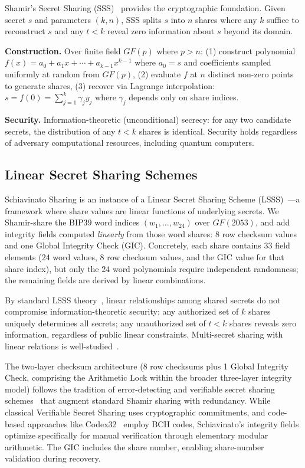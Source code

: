 \documentclass[11pt]{article}
\begin{document}
Shamir's Secret Sharing (SSS)~\cite{shamir1979} provides the cryptographic foundation. Given secret $s$ and parameters $(k, n)$, SSS splits $s$ into $n$ shares where any $k$ suffice to reconstruct $s$ and any $t < k$ reveal zero information about $s$ beyond its domain.

\textbf{Construction.} Over finite field $GF(p)$ where $p > n$: (1) construct polynomial $f(x) = a_0 + a_1 x + \cdots + a_{k-1} x^{k-1}$ where $a_0 = s$ and coefficients sampled uniformly at random from $GF(p)$, (2) evaluate $f$ at $n$ distinct non-zero points to generate shares, (3) recover via Lagrange interpolation: $s = f(0) = \sum_{j=1}^k \gamma_j y_j$ where $\gamma_j$ depends only on share indices.

\textbf{Security.} Information-theoretic (unconditional) secrecy: for any two candidate secrets, the distribution of any $t < k$ shares is identical. Security holds regardless of adversary computational resources, including quantum computers.

\subsection{Linear Secret Sharing Schemes}

Schiavinato Sharing is an instance of a Linear Secret Sharing Scheme (LSSS)~\cite{beimel2011}—a framework where share values are linear functions of underlying secrets. We Shamir-share the BIP39 word indices $(w_1,\ldots,w_{24})$ over $GF(2053)$, and add integrity fields computed \emph{linearly} from those word shares: 8 row checksum values and one Global Integrity Check (GIC). Concretely, each share contains 33 field elements (24 word values, 8 row checksum values, and the GIC value for that share index), but only the 24 word polynomials require independent randomness; the remaining fields are derived by linear combinations.

By standard LSSS theory~\cite{cramer2000}, linear relationships among shared secrets do not compromise information-theoretic security: any authorized set of $k$ shares uniquely determines all secrets; any unauthorized set of $t < k$ shares reveals zero information, regardless of public linear constraints. Multi-secret sharing with linear relations is well-studied~\cite{blundo1993}.

The two-layer checksum architecture (8 row checksums plus 1 Global Integrity Check, comprising the Arithmetic Lock within the broader three-layer integrity model) follows the tradition of error-detecting and verifiable secret sharing schemes~\cite{tompa1988,feldman1987} that augment standard Shamir sharing with redundancy. While classical Verifiable Secret Sharing uses cryptographic commitments, and code-based approaches like Codex32~\cite{codex32} employ BCH codes, Schiavinato's integrity fields optimize specifically for manual verification through elementary modular arithmetic. The GIC includes the share number, enabling share-number validation during recovery.
\end{document}
